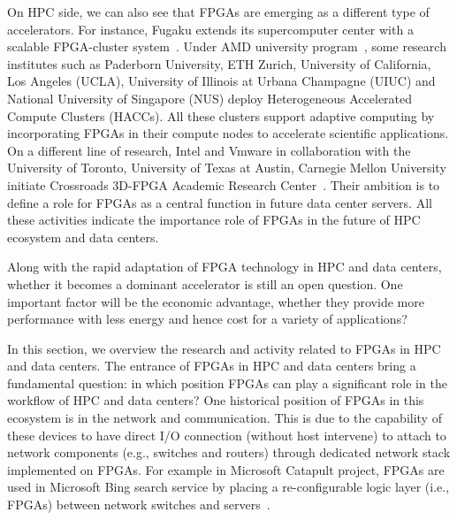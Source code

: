 On HPC side, we can also see that FPGAs are emerging as a different type of accelerators. For instance, Fugaku extends its supercomputer center with a scalable FPGA-cluster system~\cite{Sano2023ESSPER:Fugaku}. 
Under AMD university program~\cite{amd_hacc}, some research institutes such as Paderborn University, ETH Zurich, University of California, Los Angeles (UCLA), University of Illinois at Urbana Champagne (UIUC) and National University of Singapore (NUS) deploy Heterogeneous Accelerated Compute Clusters (HACCs).  All these clusters support adaptive computing by incorporating FPGAs in their compute nodes to accelerate scientific applications.   
On a different line of research, Intel and Vmware in collaboration with the University of Toronto, University of Texas at Austin, Carnegie Mellon University initiate Crossroads 3D-FPGA Academic Research Center~\cite{crossroads_fpga}. Their ambition is to define a role for FPGAs as a central function in future data center servers. All these activities indicate the importance role of FPGAs in the future of HPC ecosystem and data centers.

Along with the rapid adaptation of FPGA technology in HPC and data centers, whether it becomes a dominant accelerator is still an open question. One important factor will be the economic advantage, whether they provide more performance with less energy and hence cost for a variety of applications?



In this section, we overview the research and activity related to FPGAs in HPC and data centers. The entrance of FPGAs in HPC and data centers bring a fundamental question: in which position FPGAs can play a significant role in the workflow of HPC and data centers?
One historical position of FPGAs in this ecosystem is in the network and communication. This is due to the capability of these devices to have direct I/O connection (without host intervene) to attach to network components (e.g., switches and routers) through dedicated network stack implemented on FPGAs. For example in Microsoft Catapult project, FPGAs are used in Microsoft Bing search service by placing a re-configurable logic layer (i.e., FPGAs) between network switches and servers~\cite{PutnamAServices,caulfield2016cloud}. 

